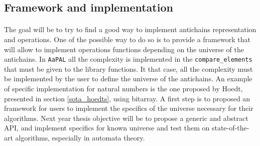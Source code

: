 \documentclass[11pt,a4paper]{article}
\theoremstyle{definition}
\begin{document}
%
%
%


\subsection{Framework and implementation}

\paragraph{}


The goal will be to try to find a good
way to implement antichains representation
and operations. One of the possible way to do so is to provide
a framework that will allow to implement
operations functions
depending on the universe of the antichains.
In \texttt{AaPAL} all the complexity
is implemented in the \texttt{compare\_elements} that must be given
to the library functions. It that case, all the complexity
must be implemented by the user to define the universe of the antichains.
An example of specific implementation for natural numbers is the one
proposed by Hoedt, presented in section \ref{sota_hoedts},
using bitarray. A first step
is to proposed an framework for users to implement the specifics of the
universe necessary for their algorithms. Next year thesis objective will
be to propose a generic and abstract API, and implement specifics
for known universe and test them on state-of-the-art algorithms,
especially in automata theory.


\newpage



\end{document}
